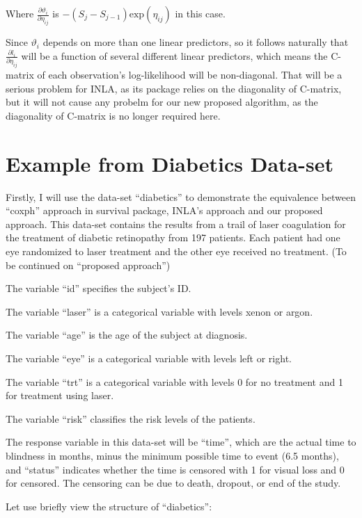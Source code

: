 \documentclass[]{article}
\begin{document}
Where \(\frac{\partial \vartheta_i}{\partial\eta_{ij}}\) is
\(-(S_j-S_{j-1})\text{exp}(\eta_{ij})\) in this case.

Since \(\vartheta_i\) depends on more than one linear predictors, so it
follows naturally that \(\frac{\partial l_i}{\partial \eta_{ij}}\) will
be a function of several different linear predictors, which means the
C-matrix of each observation's log-likelihood will be non-diagonal. That
will be a serious problem for INLA, as its package relies on the
diagonality of C-matrix, but it will not cause any probelm for our new
proposed algorithm, as the diagonality of C-matrix is no longer required
here.

\hypertarget{example-from-diabetics-data-set}{%
\section{Example from Diabetics
Data-set}\label{example-from-diabetics-data-set}}

Firstly, I will use the data-set ``diabetics'' to demonstrate the
equivalence between ``coxph'' approach in survival package, INLA's
approach and our proposed approach. This data-set contains the results
from a trail of laser coagulation for the treatment of diabetic
retinopathy from 197 patients. Each patient had one eye randomized to
laser treatment and the other eye received no treatment. (To be
continued on ``proposed approach'')

The variable ``id'' specifies the subject's ID.

The variable ``laser'' is a categorical variable with levels xenon or
argon.

The variable ``age'' is the age of the subject at diagnosis.

The variable ``eye'' is a categorical variable with levels left or
right.

The variable ``trt'' is a categorical variable with levels 0 for no
treatment and 1 for treatment using laser.

The variable ``risk'' classifies the risk levels of the patients.

The response variable in this data-set will be ``time'', which are the
actual time to blindness in months, minus the minimum possible time to
event (6.5 months), and ``status'' indicates whether the time is
censored with 1 for visual loss and 0 for censored. The censoring can be
due to death, dropout, or end of the study.

Let use briefly view the structure of ``diabetics'':
\end{document}
